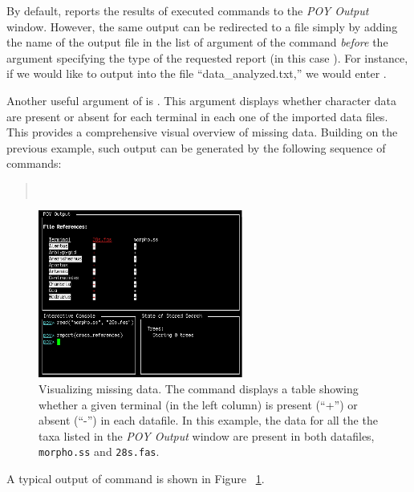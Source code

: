 By default, \poy reports the results of executed commands to the \emph{POY Output} window. However, the same output can be redirected to a file simply by adding the name of the output file in the list of argument of the command  \emph{before} the argument specifying the type of the requested report (in this case ). For instance, if we would like to output into the file ``data\_analyzed.txt,'' we would enter .

Another useful argument of  is . This argument displays whether character data are present or absent for each terminal in each one of the imported data files. This provides a comprehensive visual overview of missing data. Building on the previous example, such output can be generated by the following sequence of commands:
\begin{quote}
    \\
\end{quote}

\begin{figure}[]
    \begin{center}
        \includegraphics[width=0.6\textwidth]{doc/figures/crossref.jpg}
    \end{center}
    \caption{Visualizing missing data. The command  displays a table showing whether a given terminal (in the left column) is present (``+'') or absent (``-'') in each datafile. In this example, the data for all the the taxa listed in the \emph{POY Output} window are present in both datafiles, \texttt{morpho.ss} and \texttt{28s.fas}.}
    \label{fig:crossref}
\end{figure}

A typical output of  command is shown in Figure ~\ref{fig:crossref}.

